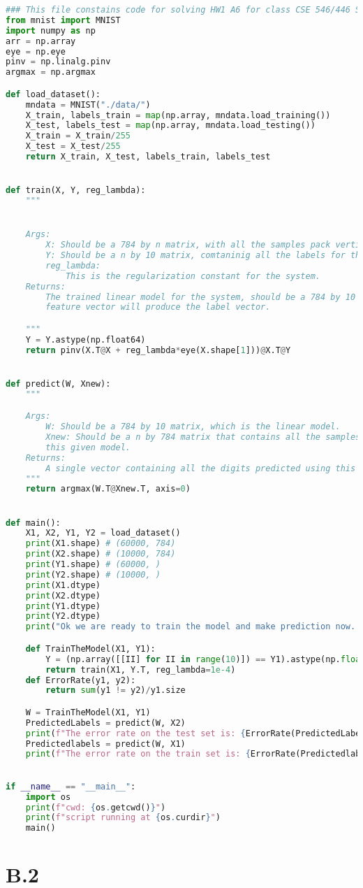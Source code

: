 \documentclass[]{article}
\begin{document}
        \begin{lstlisting}[language=python]
### This file constains code for solving HW1 A6 for class CSE 546/446 SPRING 2021.
from mnist import MNIST
import numpy as np
arr = np.array
eye = np.eye
pinv = np.linalg.pinv
argmax = np.argmax

def load_dataset():
    mndata = MNIST("./data/")
    X_train, labels_train = map(np.array, mndata.load_training())
    X_test, labels_test = map(np.array, mndata.load_testing())
    X_train = X_train/255
    X_test = X_test/255
    return X_train, X_test, labels_train, labels_test


def train(X, Y, reg_lambda):
    """


    Args:
        X: Should be a 784 by n matrix, with all the samples pack vertically as rows into the matrix.
        Y: Should be a n by 10 matrix, comtaninig all the labels for the digits pack vertically as rows for the matrix.
        reg_lambda:
            This is the regularization constant for the system.
    Returns:
        The trained linear model for the system, should be a 784 by 10 matrix such that its transpose multiply by the
        feature vector will produce the label vector.

    """
    Y = Y.astype(np.float64)
    return pinv(X.T@X + reg_lambda*eye(X.shape[1]))@X.T@Y


def predict(W, Xnew):
    """

    Args:
        W: Should be a 784 by 10 matrix, which is the linear model.
        Xnew: Should be a n by 784 matrix that contains all the samples we want to to predict with using
        this given model.
    Returns:
        A single vector containing all the digits predicted using this model.
    """
    return argmax(W.T@Xnew.T, axis=0)


def main():
    X1, X2, Y1, Y2 = load_dataset()
    print(X1.shape) # (60000, 784)
    print(X2.shape) # (10000, 784)
    print(Y1.shape) # (60000, )
    print(Y2.shape) # (10000, )
    print(X1.dtype)
    print(X2.dtype)
    print(Y1.dtype)
    print(Y2.dtype)
    print("Ok we are ready to train the model and make prediction now. ")

    def TrainTheModel(X1, Y1):
        Y = (np.array([[II] for II in range(10)]) == Y1).astype(np.float)
        return train(X1, Y.T, reg_lambda=1e-4)
    def ErrorRate(y1, y2):
        return sum(y1 != y2)/y1.size

    W = TrainTheModel(X1, Y1)
    PredictedLabels = predict(W, X2)
    print(f"The error rate on the test set is: {ErrorRate(PredictedLabels, Y2)}")
    Predictedlabels = predict(W, X1)
    print(f"The error rate on the train set is: {ErrorRate(Predictedlabels, Y1)}")
 

if __name__ == "__main__":
    import os
    print(f"cwd: {os.getcwd()}")
    print(f"script running at {os.curdir}")
    main()
        \end{lstlisting}

    \section*{B.2}
        
        
\end{document}
